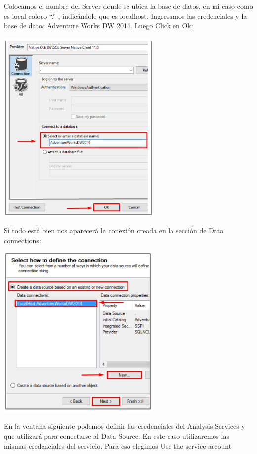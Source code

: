 Colocamos el nombre del Server donde se ubica la base de datos, en mi caso como es local coloco “.” ,
indicándole que es localhost. Ingresamos las credenciales y la base de datos Adventure Works DW 2014.
Luego Click en Ok:
	\begin{center}
	\includegraphics[width=8cm]{images/task1/img5}
    \end{center}	
Si todo está bien nos aparecerá la conexión creada en la sección de Data connections:
	\begin{center}
	\includegraphics[width=8cm]{images/task1/img6}
    \end{center}	
En la ventana siguiente podemos definir las credenciales del Analysis Services y que utilizará para conectarse
al Data Source. En este caso utilizaremos las mismas credenciales del servicio. Para eso elegimos Use the
service account    
